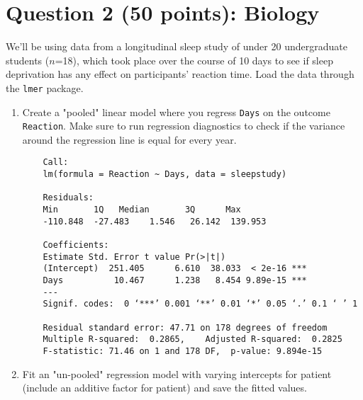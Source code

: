 \documentclass[12pt,letterpaper]{article}
\begin{document}
\section*{Question 2 (50 points): Biology}
\noindent We'll be using data from a longitudinal sleep study of under 20 undergraduate students ($n$=18), which took place over the course of 10 days to see if sleep deprivation has any effect on participants' reaction time. Load the data through the \texttt{lmer} package.

\begin{enumerate}
	\item
	Create a "pooled" linear model where you regress \texttt{Days} on the outcome \texttt{Reaction}. Make sure to run regression diagnostics to check if the variance around the regression line is equal for every year.
\begin{verbatim}	
	Call:
	lm(formula = Reaction ~ Days, data = sleepstudy)
	
	Residuals:
	Min       1Q   Median       3Q      Max 
	-110.848  -27.483    1.546   26.142  139.953 
	
	Coefficients:
	Estimate Std. Error t value Pr(>|t|)    
	(Intercept)  251.405      6.610  38.033  < 2e-16 ***
	Days          10.467      1.238   8.454 9.89e-15 ***
	---
	Signif. codes:  0 ‘***’ 0.001 ‘**’ 0.01 ‘*’ 0.05 ‘.’ 0.1 ‘ ’ 1
	
	Residual standard error: 47.71 on 178 degrees of freedom
	Multiple R-squared:  0.2865,	Adjusted R-squared:  0.2825 
	F-statistic: 71.46 on 1 and 178 DF,  p-value: 9.894e-15
\end{verbatim}

	
	\item Fit an "un-pooled" regression model with varying intercepts for patient (include an additive factor for patient) and save the fitted values.
	

\end{enumerate}
\end{document}
